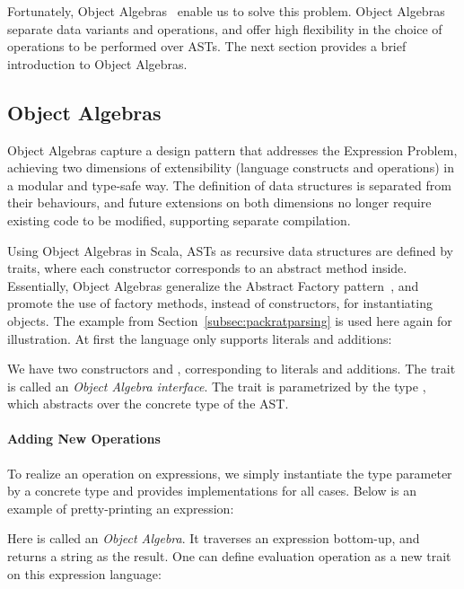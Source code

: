 Fortunately, Object Algebras~\cite{Oliveira:2012} enable us to solve
this problem. Object Algebras separate data variants and
operations, and offer high flexibility in the choice of operations to
be performed over ASTs. The next section provides a brief introduction
to Object Algebras.

\subsection{Object Algebras}\label{subsec:objectalgebras}

Object Algebras capture a design pattern that addresses the Expression
Problem, achieving two dimensions of extensibility (language
constructs and operations) in a modular and type-safe way. The
definition of data structures is separated from their behaviours, and
future extensions on both dimensions no longer require existing code
to be modified, supporting separate compilation.

Using Object Algebras in Scala, ASTs as recursive data structures are defined by traits, where each constructor corresponds to an abstract method inside.
Essentially, Object Algebras generalize the {\sc Abstract Factory} pattern~\cite{gamma1995design}, and promote the use of factory methods, instead of constructors, for instantiating objects. The example from Section~\ref{subsec:packratparsing} is used here again for illustration.
At first the language only supports literals and additions:

We have two constructors  and , corresponding to literals and additions. The trait  is called an \textit{Object Algebra interface}. The trait is parametrized by the type
, which abstracts over the concrete type of the AST.

\paragraph{Adding New Operations}
To realize an operation on expressions, we simply instantiate the type parameter by a concrete type and
provides implementations for all cases. Below is an example of pretty-printing an expression:

Here  is called an \textit{Object Algebra}. It traverses an expression bottom-up, and returns a string as the result.
One can define evaluation operation as a new trait on this expression language:

